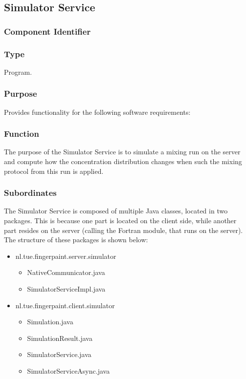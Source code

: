 \subsection{Simulator Service}
\label{subsec:simulatorservice}

\subsubsection*{Component Identifier}
\RTMSSS{}

\subsubsection*{Type}
Program.

\subsubsection*{Purpose}
Provides functionality for the following software requirements:

\noindent {}

\subsubsection*{Function}
The purpose of the Simulator Service is to simulate a mixing run on the server and compute how the concentration distribution changes when such the mixing protocol from this run is applied.

\subsubsection*{Subordinates}
The Simulator Service is composed of multiple Java classes, located in two packages. This is because one part is located on the client side, while another part resides on the server (calling the Fortran module, that runs on the server). The structure of these packages is shown below:
\begin{itemize}
	\item nl.tue.fingerpaint.server.simulator
		\begin{itemize}
			\item NativeCommunicator.java
			\item SimulatorServiceImpl.java
		\end{itemize}
	
	\item nl.tue.fingerpaint.client.simulator
		\begin{itemize}
			\item Simulation.java
			\item SimulationResult.java
			\item SimulatorService.java
			\item SimulatorServiceAsync.java
		\end{itemize}
\end{itemize}

